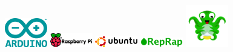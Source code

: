 \documentclass[]{cv-style}          %
\begin{document}
\vspace{-0.2cm}
\begin{figure}[!htb]
  \includegraphics[width=5em]{intaresos/arduino.png}
\endminipage\hfill
{}
  \includegraphics[width=5em]{intaresos/raspberry.png}
\endminipage\hfill
{}%
  \includegraphics[width=5em]{intaresos/ubuntu.png}
\endminipage\hfil
{}%
  \includegraphics[width=5em]{intaresos/reprap.png}
\endminipage\hfill
{}%
  \includegraphics[width=5em]{intaresos/octoprint.png}
\endminipage
\end{figure}


\end{document}
